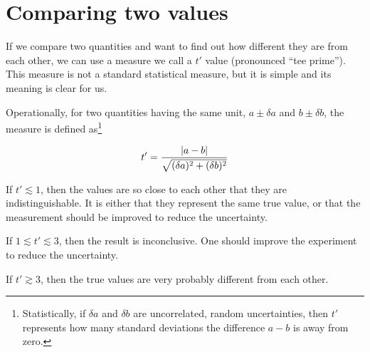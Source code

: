 \section{Comparing two values}\label{unc:sec:comparing}

If we compare two quantities and want to find out how different they are from each other, we can use a measure we call a $t'$ value (pronounced ``tee prime''). This measure is not a standard statistical measure, but it is simple and its meaning is clear for us.

Operationally, for two quantities having the same unit, $a \pm \delta a$ and $b \pm \delta b$, the measure is defined as\footnote{Statistically, if $\delta a$ and $\delta b$ are uncorrelated, random uncertainties, then $t'$ represents how many standard deviations the difference $a - b$ is away from zero.}

\begin{equation}
t' = \frac{\left\lvert a-b\right\rvert}{\sqrt{(\delta a)^2 + (\delta b)^2}}
\end{equation}

If $t' \lesssim 1$, then the values are so close to each other that they are indistinguishable. It is either that they represent the same true value, or that the measurement should be improved to reduce the uncertainty.

If $1 \lesssim t' \lesssim 3$, then the result is inconclusive. One should improve the experiment to reduce the uncertainty.

If $t' \gtrsim 3$, then the true values are very probably different from each other.